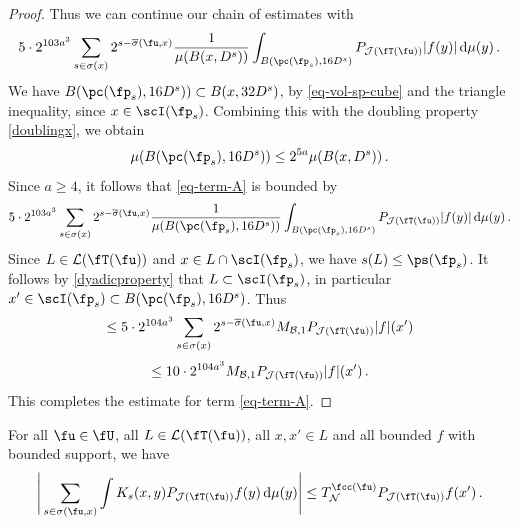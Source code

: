 \begin{proof}
    Thus we can continue our chain of estimates with
    $$
        5\cdot 2^{103a^3} \sum_{s\in\sigma(x)}2^{s - \overline{\sigma}(\fu, x)} \frac{1}{\mu(B(x,D^s))}\int_{B(\pc(\fp_s),16 D^s)}P_{\mathcal{J}(\fT(\fu))}|f(y)|\,\mathrm{d}\mu(y)\,.
    $$
    We have $B(\pc(\fp_s), 16D^s)) \subset B(x, 32D^s)$, by \eqref{eq-vol-sp-cube} and the triangle inequality, since $x \in \scI(\fp_s)$. Combining this with the doubling property \eqref{doublingx}, we obtain
    $$
        \mu(B(\pc(\fp_s), 16D^s)) \le 2^{5a} \mu(B(x, D^s))\,.
    $$
    Since $a \ge 4$, it follows that \eqref{eq-term-A} is bounded by
    $$
        5\cdot 2^{103a^3} \sum_{s\in\sigma(x)}2^{s - \overline{\sigma}(\fu, x)} \frac{1}{\mu(B(\pc(\fp_s),16D^s))}\int_{B(\pc(\fp_s),16D^s)}P_{\mathcal{J}(\fT(\fu))}|f(y)|\,\mathrm{d}\mu(y)\,.
    $$
    Since $L \in \mathcal{L}(\fT(\fu))$ and $x\in L \cap \scI(\fp_s)$, we have $s(L) \le \ps(\fp_s)$. It follows by \eqref{dyadicproperty} that $L \subset \scI(\fp_s)$, in particular $x' \in \scI(\fp_s) \subset B(\pc(\fp_s), 16D^s)$. Thus
    $$
        \le 5\cdot 2^{104a^3} \sum_{s\in\sigma(x)}2^{s - \overline{\sigma}(\fu, x)} M_{\mathcal{B}, 1}P_{\mathcal{J}(\fT(\fu))}|f|(x')
    $$
    $$
        \le 10\cdot 2^{104a^3} M_{\mathcal{B}, 1}P_{\mathcal{J}(\fT(\fu))}|f|(x')\,.
    $$
    This completes the estimate for term \eqref{eq-term-A}.
\end{proof}

\begin{lemma}
    \label{second-tree-pointwise}
    \leanok
    For all $\fu \in \fU$, all $L \in \mathcal{L}(\fT(\fu))$, all $x, x' \in L$ and all bounded $f$ with bounded support, we have
    $$
         \Bigg| \sum_{s \in \sigma(\fu, x)} \int K_s(x,y) P_{\mathcal{J}(\fT(\fu))} f(y) \, \mathrm{d}\mu(y) \Bigg| \le T_{\mathcal{N}}^{\fcc(\fu)} P_{\mathcal{J}(\fT(\fu))} f(x')\,.
    $$
\end{lemma}

